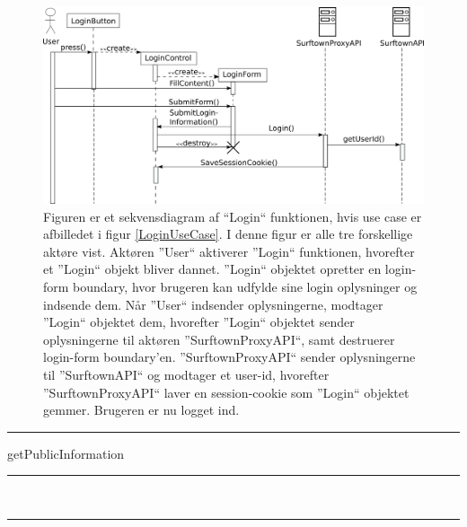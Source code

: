\documentclass[12pt]{article}
\begin{document}
\begin{figure}
	\centering
	\includegraphics[width=13cm]{sekvens_diagrammer/login.png}
	\caption{Figuren er et sekvensdiagram af ``Login`` funktionen, hvis use case er afbilledet i figur \ref{LoginUseCase}. I denne figur er alle tre forskellige aktøre vist. Aktøren ''User`` aktiverer ''Login`` funktionen, hvorefter et ''Login`` objekt bliver dannet. ''Login`` objektet opretter en login-form boundary, hvor brugeren kan udfylde sine login oplysninger og indsende dem. Når ''User`` indsender oplysningerne, modtager ''Login`` objektet dem, hvorefter ''Login`` objektet sender oplysningerne til aktøren ''SurftownProxyAPI``, samt destruerer login-form boundary'en. ''SurftownProxyAPI`` sender oplysningerne til ''SurftownAPI`` og modtager et user-id, hvorefter ''SurftownProxyAPI`` laver en session-cookie som ''Login`` objektet gemmer. Brugeren er nu logget ind.}
	\label{fig:Login}
\end{figure}
\newpage
	\hspace{-20pt}
	\rule{430pt}{1.0pt}
	 getPublicInformation\\
	\rule{430pt}{0.4pt}
	\\
	\rule{430pt}{0.4pt}
	\\
\end{document}
